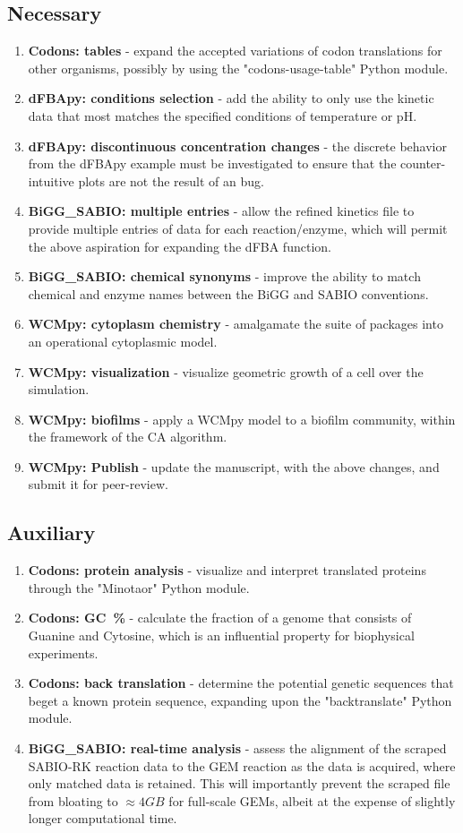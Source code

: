 \subsection{Necessary}
\begin{enumerate}
    \item \textbf{Codons: tables} - expand the accepted variations of codon translations for other organisms, possibly by using the "codons-usage-table" Python module.
    \item \textbf{dFBApy: conditions selection} - add the ability to only use the kinetic data that most matches the specified conditions of temperature or pH.
    \item \textbf{dFBApy: discontinuous concentration changes} - the discrete behavior from the dFBApy example must be investigated to ensure that the counter-intuitive plots are not the result of an bug.
    \item \textbf{BiGG\_SABIO: multiple entries} - allow the refined kinetics file to provide multiple entries of data for each reaction/enzyme, which will permit the above aspiration for expanding the dFBA function.
    \item \textbf{BiGG\_SABIO: chemical synonyms} - improve the ability to match chemical and enzyme names between the BiGG and SABIO conventions.
    \item \textbf{WCMpy: cytoplasm chemistry} - amalgamate the suite of packages into an operational cytoplasmic model.
    \item \textbf{WCMpy: visualization} - visualize geometric growth of a cell over the simulation.
    \item \textbf{WCMpy: biofilms} - apply a WCMpy model to a biofilm community, within the framework of the CA algorithm.
    \item \textbf{WCMpy: Publish} - update the manuscript, with the above changes, and submit it for peer-review.
\end{enumerate}

\subsection{Auxiliary}
\begin{enumerate}
    \item \textbf{Codons: protein analysis} - visualize and interpret translated proteins through the "Minotaor" Python module.
    \item \textbf{Codons: GC~\%} - calculate the fraction of a genome that consists of Guanine and Cytosine, which is an influential property for biophysical experiments.
    \item \textbf{Codons: back translation} - determine the potential genetic sequences that beget a known protein sequence, expanding upon the "backtranslate" Python module.
    \item \textbf{BiGG\_SABIO: real-time analysis} - assess the alignment of the scraped SABIO-RK reaction data to the GEM reaction as the data is acquired, where only matched data is retained. This will importantly prevent the scraped file from bloating to $\approx 4 GB$ for full-scale GEMs, albeit at the expense of slightly longer computational time.
\end{enumerate}